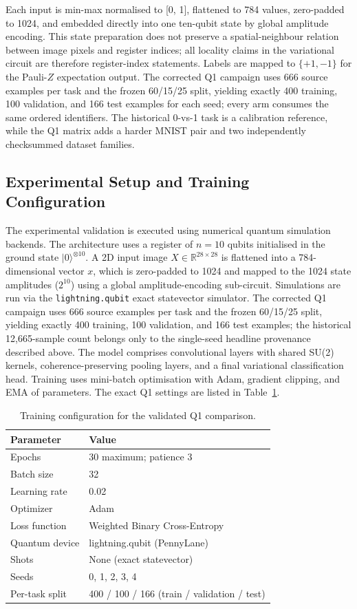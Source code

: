 \documentclass[conference]{IEEEtran}
\begin{document}
Each input is min-max normalised to [0, 1], flattened to 784 values, zero-padded to 1024, and embedded directly into one ten-qubit state by global amplitude encoding. This state preparation does not preserve a spatial-neighbour relation between image pixels and register indices; all locality claims in the variational circuit are therefore register-index statements. Labels are mapped to $\{+1, -1\}$ for the Pauli-$Z$ expectation output. The corrected Q1 campaign uses 666 source examples per task and the frozen 60/15/25 split, yielding exactly 400 training, 100 validation, and 166 test examples for each seed; every arm consumes the same ordered identifiers. The historical 0-vs-1 task is a calibration reference, while the Q1 matrix adds a harder MNIST pair and two independently checksummed dataset families.

\subsection{Experimental Setup and Training Configuration}
The experimental validation is executed using numerical quantum simulation backends. The architecture uses a register of $n = 10$ qubits initialised in the ground state $|0\rangle^{\otimes 10}$. A 2D input image $X \in \mathbb{R}^{28 \times 28}$ is flattened into a 784-dimensional vector $x$, which is zero-padded to 1024 and mapped to the 1024 state amplitudes ($2^{10}$) using a global amplitude-encoding sub-circuit. Simulations are run via the \texttt{lightning.qubit} exact statevector simulator. The corrected Q1 campaign uses 666 source examples per task and the frozen 60/15/25 split, yielding exactly 400 training, 100 validation, and 166 test examples; the historical 12,665-sample count belongs only to the single-seed headline provenance described above. The model comprises convolutional layers with shared SU(2) kernels, coherence-preserving pooling layers, and a final variational classification head. Training uses mini-batch optimisation with Adam, gradient clipping, and EMA of parameters. The exact Q1 settings are listed in Table~\ref{tab:training}.

\begin{table}[!t]
\caption{Training configuration for the validated Q1 comparison.}
\label{tab:training}
\centering
\begin{tabular}{ll}
\toprule
\textbf{Parameter} & \textbf{Value} \\
\midrule
Epochs & 30 maximum; patience 3 \\
Batch size & 32 \\
Learning rate & 0.02 \\
Optimizer & Adam \\
Loss function & Weighted Binary Cross-Entropy \\
Quantum device & lightning.qubit (PennyLane) \\
Shots & None (exact statevector) \\
Seeds & 0, 1, 2, 3, 4 \\
Per-task split & 400 / 100 / 166 (train / validation / test) \\
\bottomrule
\end{tabular}
\end{table}
\end{document}
